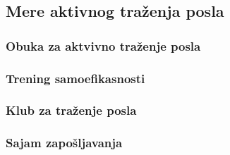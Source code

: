 \subsection{Mere aktivnog tra\v zenja posla}

\subsubsection{Obuka za aktvivno tra\v zenje posla}

\subsubsection{Trening samoefikasnosti}

\subsubsection{Klub za tra\v zenje posla}

\subsubsection{Sajam zapo\v sljavanja}